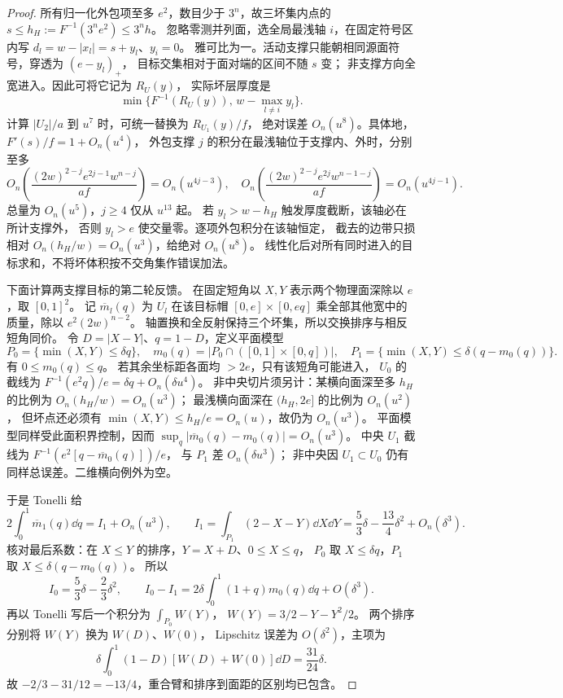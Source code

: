 \begin{proof}
所有归一化外包项至多 \(e^2\)，数目少于 \(3^n\)，故三坏集内点的
\(s\le h_H:=F^{-1}(3^ne^2)\le3^nh\)。
忽略零测并列面，选全局最浅轴 \(i\)，在固定符号区内写
\(d_l=w-|x_l|=s+y_l\)、\(y_i=0\)。
雅可比为一。活动支撑只能朝相同源面符号，穿透为 \((e-y_l)_+\)，
目标交集相对于面对端的区间不随 \(s\) 变；
非支撑方向全宽进入。因此可将它记为 \(R_U(y)\)，
实际坏层厚度是
\[
 \min\{F^{-1}(R_U(y)),\,w-\max_{l\ne i}y_l\}.
\]
计算 \(|U_2|/a\) 到 \(u^7\) 时，可统一替换为 \(R_{U_1}(y)/f\)，
绝对误差 \(O_n(u^8)\)。具体地，\(F'(s)/f=1+O_n(u^4)\)，
外包支撑 \(j\) 的积分在最浅轴位于支撑内、外时，分别至多
\[
 O_n\!\left(\frac{(2w)^{2-j}e^{2j-1}w^{n-j}}{af}\right)=O_n(u^{4j-3}),
 \quad
 O_n\!\left(\frac{(2w)^{2-j}e^{2j}w^{n-1-j}}{af}\right)=O_n(u^{4j-1}).
\]
总量为 \(O_n(u^5)\)，\(j\ge4\) 仅从 \(u^{13}\) 起。
若 \(y_l>w-h_H\) 触发厚度截断，该轴必在所计支撑外，
否则 \(y_l>e\) 使交量零。逐项外包积分在该轴恒定，
截去的边带只损相对 \(O_n(h_H/w)=O_n(u^3)\)，给绝对 \(O_n(u^8)\)。
线性化后对所有同时进入的目标求和，不将坏体积按不交角集作错误加法。

下面计算两支撑目标的第二轮反馈。
在固定短角以 \(X,Y\) 表示两个物理面深除以 \(e\)，取 \([0,1]^2\)。
记 \(\overline m_l(q)\) 为 \(U_l\) 在该目标帽
\([0,e]\times[0,eq]\) 乘全部其他宽中的质量，除以
\(e^2(2w)^{n-2}\)。
轴置换和全反射保持三个坏集，所以交换排序与相反短角同价。
令 \(D=|X-Y|\)、\(q=1-D\)，定义平面模型
\[
 P_0=\{\min(X,Y)\le\delta q\},\quad
 m_0(q)=|P_0\cap([0,1]\times[0,q])|,\quad
 P_1=\{\min(X,Y)\le\delta(q-m_0(q))\}.
\]
有 \(0\le m_0(q)\le q\)。
若其余坐标距各面均 \(>2e\)，只有该短角可能进入，
\(U_0\) 的截线为
\(F^{-1}(e^2q)/e=\delta q+O_n(\delta u^4)\)。
非中央切片须另计：某横向面深至多 \(h_H\) 的比例为
\(O_n(h_H/w)=O_n(u^3)\)；
最浅横向面深在 \((h_H,2e]\) 的比例为 \(O_n(u^2)\)，
但坏点还必须有 \(\min(X,Y)\le h_H/e=O_n(u)\)，故仍为 \(O_n(u^3)\)。
平面模型同样受此面积界控制，因而
\(\sup_q|\overline m_0(q)-m_0(q)|=O_n(u^3)\)。
中央 \(U_1\) 截线为
\(F^{-1}(e^2[q-\overline m_0(q)])/e\)，
与 \(P_1\) 差 \(O_n(\delta u^3)\)；
非中央因 \(U_1\subset U_0\) 仍有同样总误差。二维横向例外为空。

于是 Tonelli 给
\begin{equation}\label{eighth:second-moment}
 2\int_0^1\overline m_1(q)\dd q
 =I_1+O_n(u^3),\qquad
 I_1=\int_{P_1}(2-X-Y)\dd X\dd Y
 =\frac53\delta-\frac{13}{4}\delta^2+O_n(\delta^3).
\end{equation}
核对最后系数：在 \(X\le Y\) 的排序，\(Y=X+D\)、\(0\le X\le q\)，
\(P_0\) 取 \(X\le\delta q\)，\(P_1\) 取 \(X\le\delta(q-m_0(q))\)。
所以
\[
 I_0=\frac53\delta-\frac23\delta^2,\qquad
 I_0-I_1=2\delta\int_0^1(1+q)m_0(q)\dd q+O(\delta^3).
\]
再以 Tonelli 写后一个积分为 \(\int_{P_0}W(Y)\)，
\(W(Y)=3/2-Y-Y^2/2\)。
两个排序分别将 \(W(Y)\) 换为 \(W(D)\)、\(W(0)\)，
Lipschitz 误差为 \(O(\delta^2)\)，主项为
\[
 \delta\int_0^1(1-D)[W(D)+W(0)]\dd D
 =\frac{31}{24}\delta .
\]
故 \(-2/3-31/12=-13/4\)，重合臂和排序到面距的区别均已包含。


\end{proof}
